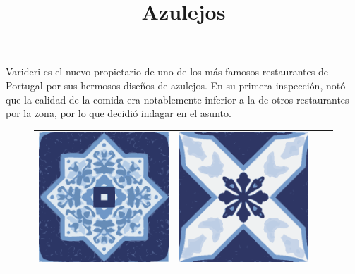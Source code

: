 \documentclass{oci}
\title{Azulejos}
\begin{document}
\begin{problemDescription}
Varideri es el nuevo propietario de uno de los más famosos restaurantes de Portugal por sus hermosos diseños de azulejos.
En su primera inspección, notó que la calidad de la comida era notablemente inferior a la de otros restaurantes por la zona, por lo que decidió indagar en el asunto.

\setlength{\tabcolsep}{0.5pt}
\begin{figure}[h]
  \begin{center}
    {
      \renewcommand{\arraystretch}{0.25}
      \begin{tabular}{cccc}
        \includegraphics[scale=0.3]{a.eps} &
        \includegraphics[scale=0.3]{b.eps} &

\end{tabular}}
\end{center}
\end{figure}
\end{problemDescription}
\end{document}
